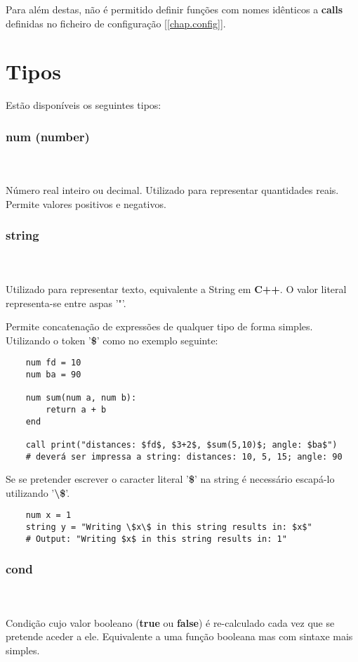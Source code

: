 \documentclass{report}
\begin{document}
Para além destas, não é permitido definir funções com nomes idênticos a \textbf{calls} definidas no ficheiro de configuração [\ref{chap.config}].

\section{Tipos}
Estão disponíveis os seguintes tipos:
\subsubsection{num (number)}\\
    \\Número real inteiro ou decimal. Utilizado para representar quantidades reais. Permite valores positivos e negativos.
\subsubsection{string}\\
    \\Utilizado para representar texto, equivalente a String em \textbf{C++}. O valor literal representa-se entre aspas '"'.
    
    Permite concatenação de expressões de qualquer tipo de forma simples. Utilizando o token '\textbf{\$}' como no exemplo seguinte:
    
    \begin{verbatim}
    num fd = 10
    num ba = 90
    
    num sum(num a, num b): 
        return a + b
    end
    
    call print("distances: $fd$, $3+2$, $sum(5,10)$; angle: $ba$")
    # deverá ser impressa a string: distances: 10, 5, 15; angle: 90
    \end{verbatim}
    
    Se se pretender escrever o caracter literal '\textbf{\$}' na string é necessário escapá-lo utilizando '\textbf{\textbackslash\$}'.
    \begin{verbatim}
    num x = 1
    string y = "Writing \$x\$ in this string results in: $x$"
    # Output: "Writing $x$ in this string results in: 1"
    \end{verbatim}
    
\subsubsection{cond}\\
    \\Condição cujo valor booleano (\textbf{true} ou \textbf{false}) é re-calculado cada vez que se pretende aceder a ele.
    Equivalente a uma função booleana mas com sintaxe mais simples.
    
\end{document}
